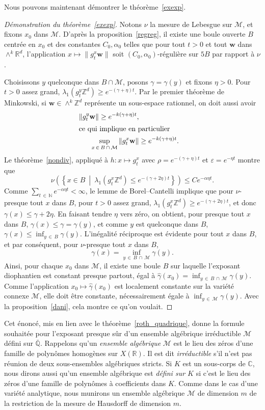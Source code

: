 \documentclass[AHL,Unicode,longabstracts,francais,published]{cedram}
\newcommand{\R}{\mathbb{R}}
\newcommand{\C}{\mathbb{C}}
\newcommand{\Z}{\mathbb{Z}}
\newcommand{\N}{\mathbb{N}}
\newcommand{\QQ}{\overline{\mathbb{Q}}}
\newcommand{\bw}{\mathbf{w}}
\newcommand{\cM}{\mathcal{M}}
\newcommand{\ggamma}{\widehat{\gamma}}
\newcommand{\eps}{\varepsilon}
\begin{document}
Nous pouvons maintenant démontrer le théorème~\ref{exexp}.

\begin{proof}[Démonstration du théorème~\ref{exexp}]
Notons $\nu$ la mesure de Lebesgue sur $\cM$, et fixons $x_0$ dans $\cM$. D'après la proposition~\ref{regreg}, il existe une boule ouverte $B$ centrée en $x_0$ et des constantes $C_0,\alpha_0$ telles que pour tout $t>0$ et tout $\bw$ dans $\wedge^k\R^d$, l'application $x\mapsto\|g_t^x\bw\|$ soit $(C_0,\alpha_0)$-régulière sur $5B$ par rapport à $\nu$.

Choisissons $y$ quelconque dans $B\cap\cM$, posons $\gamma=\gamma(y)$ et fixons $\eta>0$. Pour $t>0$ assez grand, $\lambda_1(g_t^y\Z^d)\geq e^{-(\gamma+\eta)t}$. Par le premier théorème de Minkowski, si $\bw\in\wedge^k\Z^d$ représente un sous-espace rationnel, on doit aussi avoir
\begin{align*}
\left\|g_t^y\bw\right\| \geq e^{-k(\gamma+\eta) t},
\\
\intertext{ce qui implique en particulier}
\sup_{x\,\in\,B\,\cap\,\cM} \left\|g_t^x\bw\right\| &\geq e^{-k(\gamma+\eta) t}.
\end{align*}
Le théorème~\ref{nondiv}, appliqué à $h:x\mapsto g_t^x$ avec $\rho=e^{-(\gamma+\eta)t}$ et $\eps=e^{-\eta t}$ montre que
\[
\nu\left(\left\{x\in B \ \middle|\ \lambda_1\left(g_t^x\Z^d\right)\leq e^{-\left(\gamma+2\eta\right)t}\right\}\right) \leq C e^{-\alpha\eta t}.
\]
Comme $\sum_{t\,\in\,\N}e^{-\alpha\eta t}<\infty$, le lemme de Borel--Cantelli implique que pour $\nu$-presque tout $x$ dans $B$, pour $t>0$ assez grand, $\lambda_1(g_t^x\Z^d)\geq e^{-(\gamma+2\eta)t}$, et donc $\gamma(x)\leq\gamma+2\eta$. En faisant tendre $\eta$ vers zéro, on obtient, pour presque tout $x$ dans $B$, $\gamma(x)\leq\gamma=\gamma(y)$, et comme $y$ est quelconque dans $B$, $\gamma(x)\leq\inf_{y\,\in\,B}\gamma(y)$. L'inégalité réciproque est évidente pour tout $x$ dans $B$, et par conséquent, pour $\nu$-presque tout $x$ dans $B$,
\[
\gamma(x) = \inf_{y\,\in\,B\,\cap\,\cM}\gamma(y).
\]
Ainsi, pour chaque $x_0$ dans $\cM$, il existe une boule $B$ sur laquelle l'exposant diophantien est constant presque partout, égal à $\ggamma(x_0)=\inf_{y\,\in\,B\,\cap\,\cM}\gamma(y)$. Comme l'application $x_0\mapsto\ggamma(x_0)$ est localement constante sur la variété connexe $\cM$, elle doit être constante, nécessairement égale à $\inf_{y\,\in\,\cM}\gamma(y)$. Avec la proposition~\ref{dani}, cela montre ce qu'on voulait.
\end{proof}

Cet énoncé, mis en lien avec le théorème~\ref{roth_quadrique}, donne la formule souhaitée pour l'exposant presque sûr d'un ensemble algébrique irréductible $\cM$ défini sur $\QQ$. Rappelons qu'un \emph{ensemble algébrique} $\cM$ est le lieu des zéros d'une famille de polynômes homogènes sur $X(\R)$. Il est dit \emph{irréductible} s'il n'est pas réunion de deux sous-ensembles algébriques stricts. Si $K$ est un sous-corps de $\C$, nous dirons aussi qu'un ensemble algébrique est \emph{défini sur $K$} si c'est le lieu des zéros d'une famille de polynômes à coefficients dans $K$. Comme dans le cas d'une variété analytique, nous munirons un ensemble algébrique $\cM$ de dimension $m$ de la restriction de la mesure de Hausdorff de dimension $m$.
\end{document}
